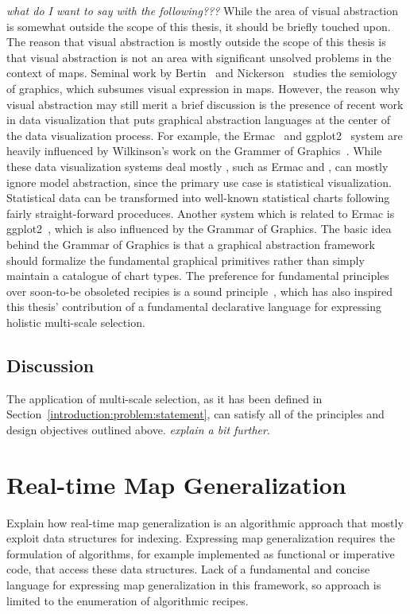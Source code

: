 \documentclass[11pt, oneside]{report}
\begin{document}
{\emph{what do I want to say with the following???}
While the area of visual abstraction is somewhat outside the scope of this thesis, it should be briefly touched upon. The reason that visual abstraction is mostly outside the scope of this thesis is that visual abstraction is not an area with significant unsolved problems in the context of maps. Seminal work by Bertin~\cite{jacques1967semiologie} and Nickerson~\cite{nickerson1994visual} studies the semiology of graphics, which subsumes visual expression in maps. However, the reason why visual abstraction may still merit a brief discussion is the presence of recent work in data visualization that puts graphical abstraction languages at the center of the data visualization process. For example, the Ermac~\cite{wu2014case} and ggplot2~\cite{wickham2009ggplot2} system are heavily influenced by Wilkinson's work on the Grammer of Graphics~\cite{wilkinson2006grammar}. While these data visualization systems deal mostly , such as Ermac and , can mostly ignore model abstraction, since the primary use case is statistical visualization. Statistical data can be transformed into well-known statistical charts following fairly straight-forward proceduces. Another system which is related to Ermac is ggplot2~\cite{wickham2009ggplot2}, which is also influenced by the Grammar of Graphics. The basic idea behind the Grammar of Graphics is that a graphical abstraction framework should formalize the fundamental graphical primitives rather than simply maintain a catalogue of chart types. The preference for fundamental principles over soon-to-be obsoleted recipies is a sound principle~\cite{koch2013abstraction}, which has also inspired this thesis' contribution of a fundamental declarative language for expressing holistic multi-scale selection.

\subsection{Discussion}

The application of multi-scale selection, as it has been defined in Section~\ref{introduction:problem:statement}, can satisfy all of the principles and design objectives outlined above. \emph{explain a bit further}.


\section{Real-time Map Generalization}

Explain how real-time map generalization is an algorithmic approach that mostly exploit data structures for indexing. Expressing map generalization requires the formulation of algorithms, for example implemented as functional or imperative code, that access these data structures. Lack of a fundamental and concise language for expressing map generalization in this framework, so approach is limited to the enumeration of algorithmic recipes.

}
\end{document}
